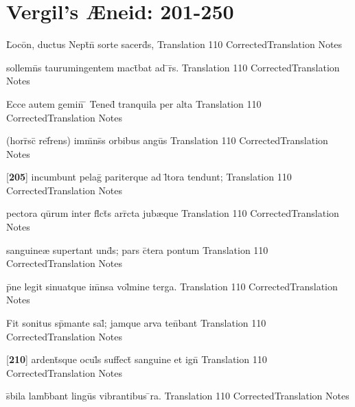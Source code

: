 \section{Vergil's {\AE}neid: 201-250} %

\latline
  {L\={}oco\={}n, ductus Nept\={}n\={} sorte sacerd\={}s,}
  { Translation }
  {110}
  { CorrectedTranslation }
  { Notes }


\latline
  {sollemn\={\macron {\i}}s taurumingentem mact\={}bat ad \={}r\={}s.}
  { Translation }
  {110}
  { CorrectedTranslation }
  { Notes }


\latline
  {Ecce autem gemin\={\macron {\i}} \={} Tened\={} tranquila per alta}
  { Translation }
  {110}
  { CorrectedTranslation }
  { Notes }


\latline
  {(horr\={}sc\={} ref\={}rens) imm\={}ns\={\macron {\i}}s orbibus angu\={}s}
  { Translation }
  {110}
  { CorrectedTranslation }
  { Notes }


\latline
  {[\textbf{205}] incumbunt pelag\={} pariterque ad l\={\macron {\i}}tora tendunt;}
  { Translation }
  {110}
  { CorrectedTranslation }
  { Notes }


\latline
  {pectora qu\={}rum inter fl\={}ct\={}s arr\={}cta jub{\ae}que}
  { Translation }
  {110}
  { CorrectedTranslation }
  { Notes }


\latline
  {sanguine{\ae} supertant und\={}s; pars c\={}tera pontum}
  { Translation }
  {110}
  { CorrectedTranslation }
  { Notes }


\latline
  {p\={}ne legit sinuatque im\={}nsa vol\={}mine terga.}
  { Translation }
  {110}
  { CorrectedTranslation }
  { Notes }


\latline
  {Fit sonitus sp\={}mante sal\={}; jamque arva ten\={}bant }
  { Translation }
  {110}
  { CorrectedTranslation }
  { Notes }


\latline
  {[\textbf{210}] ardent\={\macron {\i}}sque ocul\={}s suffect\={\macron {\i}} sanguine et ign\={\macron {\i}}}
  { Translation }
  {110}
  { CorrectedTranslation }
  { Notes }


\latline
  {s\={\macron {\i}}bila lamb\={}bant lingu\={\macron {\i}}s vibrantibus \={}ra.}
  { Translation }
  {110}
  { CorrectedTranslation }
  { Notes }


